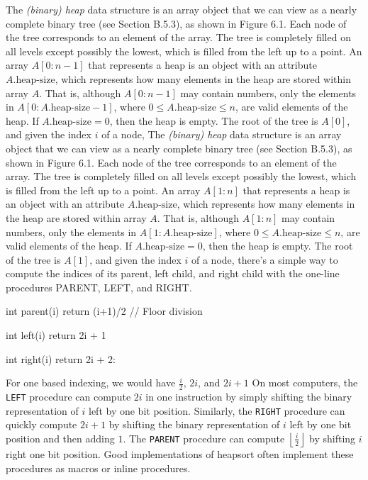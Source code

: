 \documentclass{report}
\begin{document}
\pagebreak 
{}
\bigbreak \noindent 
The \textit{(binary) heap} data structure is an array object that we can view as a nearly complete binary tree (see Section B.5.3), as shown in Figure 6.1. Each node of the tree corresponds to an element of the array. The tree is completely filled on all levels except possibly the lowest, which is filled from the left up to a point. An array $A[0 : n-1]$ that represents a heap is an object with an attribute $A.\text{heap-size}$, which represents how many elements in the heap are stored within array $A$. That is, although $A[0 : n-1]$ may contain numbers, only the elements in $A[0 : A.\text{heap-size}-1]$, where $0 \leq A.\text{heap-size} \leq n$, are valid elements of the heap. If $A.\text{heap-size} = 0$, then the heap is empty. The root of the tree is $A[0]$, and given the index $i$ of a node,
\bigbreak \noindent 
The \textit{(binary) heap} data structure is an array object that we can view as a nearly complete binary tree (see Section B.5.3), as shown in Figure 6.1. Each node of the tree corresponds to an element of the array. The tree is completely filled on all levels except possibly the lowest, which is filled from the left up to a point. An array $A[1 : n]$ that represents a heap is an object with an attribute $A.\text{heap-size}$, which represents how many elements in the heap are stored within array $A$. That is, although $A[1 : n]$ may contain numbers, only the elements in $A[1 : A.\text{heap-size}]$, where $0 \leq A.\text{heap-size} \leq n$, are valid elements of the heap. If $A.\text{heap-size} = 0$, then the heap is empty. The root of the tree is $A[1]$, and given the index $i$ of a node,
\bigbreak \noindent 
{}
\bigbreak \noindent 
there’s a simple way to compute the indices of its parent, left child, and right child with the one-line procedures PARENT, LEFT, and RIGHT.
\bigbreak \noindent 
\begin{cppcode}
    int parent(i) {
        return (i+1)/2 // Floor division
    }

    int left(i) {
        return 2i + 1
    }

    int right(i) {
        return 2i + 2:
    }
\end{cppcode}
\bigbreak \noindent 
For one based indexing, we would have $\frac{i}{2}$, $2i$, and $2i+1$
\bigbreak \noindent 
On most computers, the \texttt{LEFT} procedure can compute $2i$ in one instruction by simply shifting the binary representation of $i$ left by one bit position. Similarly, the \texttt{RIGHT} procedure can quickly compute $2i + 1$ by shifting the binary representation of $i$ left by one bit position and then adding $1$. The \texttt{PARENT} procedure can compute $\left\lfloor \frac{i}{2} \right\rfloor$ by shifting $i$ right one bit position. Good implementations of heapsort often implement these procedures as macros or inline procedures.
\pagebreak 
\end{document}
